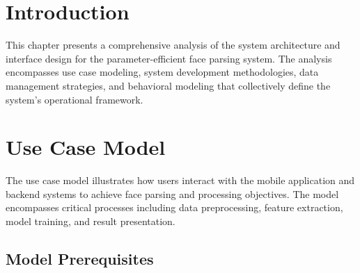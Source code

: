 \documentclass[12pt,a4paper]{report}
\begin{document}
\section{Introduction}

This chapter presents a comprehensive analysis of the system architecture and interface design for the parameter-efficient face parsing system. The analysis encompasses use case modeling, system development methodologies, data management strategies, and behavioral modeling that collectively define the system's operational framework.

\section{Use Case Model}

The use case model illustrates how users interact with the mobile application and backend systems to achieve face parsing and processing objectives. The model encompasses critical processes including data preprocessing, feature extraction, model training, and result presentation.

\subsection{Model Prerequisites}
\end{document}
